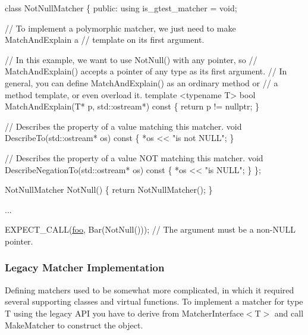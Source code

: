 \begin{DoxyCode}
\textcolor{keyword}{class }NotNullMatcher \{
 \textcolor{keyword}{public}:
  \textcolor{keyword}{using} is\_gtest\_matcher = void;

  \textcolor{comment}{// To implement a polymorphic matcher, we just need to make MatchAndExplain a}
  \textcolor{comment}{// template on its first argument.}

  \textcolor{comment}{// In this example, we want to use NotNull() with any pointer, so}
  \textcolor{comment}{// MatchAndExplain() accepts a pointer of any type as its first argument.}
  \textcolor{comment}{// In general, you can define MatchAndExplain() as an ordinary method or}
  \textcolor{comment}{// a method template, or even overload it.}
  \textcolor{keyword}{template} <\textcolor{keyword}{typename} T>
  \textcolor{keywordtype}{bool} MatchAndExplain(T* p, std::ostream*)\textcolor{keyword}{ const }\{
    \textcolor{keywordflow}{return} p != \textcolor{keyword}{nullptr};
  \}

  \textcolor{comment}{// Describes the property of a value matching this matcher.}
  \textcolor{keywordtype}{void} DescribeTo(std::ostream* os)\textcolor{keyword}{ const }\{ *os << \textcolor{stringliteral}{"is not NULL"}; \}

  \textcolor{comment}{// Describes the property of a value NOT matching this matcher.}
  \textcolor{keywordtype}{void} DescribeNegationTo(std::ostream* os)\textcolor{keyword}{ const }\{ *os << \textcolor{stringliteral}{"is NULL"}; \}
\};

NotNullMatcher NotNull() \{
  \textcolor{keywordflow}{return} NotNullMatcher();
\}

...

  EXPECT\_CALL(\mbox{\hyperlink{namespacefoo}{foo}}, Bar(NotNull()));  \textcolor{comment}{// The argument must be a non-NULL pointer.}
\end{DoxyCode}


\subsubsection*{Legacy Matcher Implementation}

Defining matchers used to be somewhat more complicated, in which it required several supporting classes and virtual functions. To implement a matcher for type {\ttfamily T} using the legacy A\+PI you have to derive from {\ttfamily Matcher\+Interface$<$T$>$} and call {\ttfamily Make\+Matcher} to construct the object.

